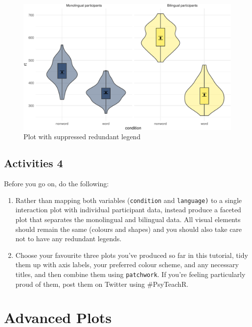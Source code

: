\documentclass[
  english,
  doc,floatsintext]{apa6}
\begin{document}
\begin{figure}

{\centering \includegraphics[width=1\linewidth]{images/legend-suppress-1} 

}

\caption{Plot with suppressed redundant legend}\label{fig:legend-suppress}
\end{figure}

\hypertarget{activities-4}{%
\subsection{Activities 4}\label{activities-4}}

Before you go on, do the following:

\begin{enumerate}
\def\labelenumi{\arabic{enumi}.}
\item
  Rather than mapping both variables (\texttt{condition} and \texttt{language)} to a single interaction plot with individual participant data, instead produce a faceted plot that separates the monolingual and bilingual data. All visual elements should remain the same (colours and shapes) and you should also take care not to have any redundant legends.
\item
  Choose your favourite three plots you've produced so far in this tutorial, tidy them up with axis labels, your preferred colour scheme, and any necessary titles, and then combine them using \texttt{patchwork}. If you're feeling particularly proud of them, post them on Twitter using \#PsyTeachR.
\end{enumerate}

\hypertarget{advanced-plots}{%
\section{Advanced Plots}\label{advanced-plots}}
\end{document}
